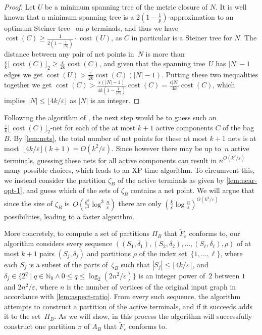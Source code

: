 \documentclass[a4paper]{article}
\let\oldcitet\citet
\renewcommand{\citet}[1]{\mbox{\oldcitet{#1}}}
\theoremstyle{plain}
\newcommand{\eps}{{\varepsilon}}
\DeclareMathOperator{\cost}{cost}
\newcommand{\pow}[1]{\lfloor #1\rfloor_{2}}
\begin{document}
%
\begin{proof}%
Let $U$ be a minimum spanning tree of the metric closure of $N$.
It is well known that a minimum spanning tree is a $2(1-\frac{1}{p})$-approximation to an optimum Steiner tree~\cite{KouMB81} on $p$ terminals, 
and thus we have $\cost(C)\geq\frac{1}{2(1-\frac{1}{|N|})}\cdot\cost(U)$, as $C$ in particular is a Steiner tree for $N$. The distance between any pair of 
net points in~$N$ is more than $\frac{\eps}{k}\pow{\cost(C)}\geq \frac{\eps}{2k}\cost(C)$, 
and given that the spanning tree~$U$ has $|N|-1$ edges we get $\cost(U)>\frac{\eps}{2k}\cost(C)(|N|-1)$. 
Putting these two inequalities together we get $\cost(C)>\frac{\eps(|N|-1)}{4k(1-\frac{1}{|N|})}\cost(C)=\frac{\eps|N|}{4k}\cost(C)$, which implies $|N|\leq\lfloor 4k/\eps\rfloor$ as $|N|$ is an integer.
\end{proof}
%

Following the algorithm of \citet{bateni2011approximation}, the next step would be to guess such an 
$\frac{\eps}{k}\pow{\cost(C)}$-net for each of the at most $k+1$ active components $C$ of the bag $B$.
By \autoref{lem:nets}, the total number of net points for these at most $k+1$ nets is at most~$\lfloor 4k/\eps\rfloor(k+1)=O(k^2/\eps)$.
Since however there may be up to~$n$ active terminals, guessing these nets for all active components
can result in $n^{O(k^2/\eps)}$ many possible choices, which leads to an XP time algorithm. 
To circumvent this, we instead consider the partition $\zeta_B$ of the active terminals as given by \autoref{lem:near-opt-1}, 
and guess which of the sets of $\zeta_B$ contains a net point.
We will argue that since the size of $\zeta_B$ is~$O(\frac{k^6}{\eps^2}\log^3\frac{n}{\eps})$ there are only $(\frac{k}{\eps}\log \frac{n}{\eps})^{O(k^2/\eps)}$ possibilities, leading to a faster algorithm.

%
%
%
%
%
%
%
%

More concretely, to compute a set of partitions $\Pi_B$ that $\widetilde{F}_\eps$ conforms to, 
our algorithm considers every sequence $((S_1,\delta_1),(S_2,\delta_2),\ldots,(S_\ell,\delta_\ell),\rho)$
of at most $k+1$ pairs $(S_j,\delta_j)$ and partitions $\rho$ of the index set~$\{1,\ldots,\ell\}$, 
where each $S_j$ is a subset of the parts of~$\zeta_B$ such that $|S_j|\leq \lfloor 4k/\eps\rfloor$, 
and $\delta_j\in\{2^q\mid q\in\mathbb{N}_0\land 0\leq q\leq \log_2(2n^2/\eps)\}$ is an integer power of~$2$ between $1$
and $2n^2/\eps$, where $n$ is the number of vertices of the original input graph in accordance with \autoref{lem:aspect-ratio}.
From every such sequence, the algorithm attempts to construct a partition of the active terminals, and if it
succeeds adds it to the set~$\Pi_B$. As we will show, in this process the algorithm will successfully construct
one partition $\pi$ of $A_B$ that $\widetilde{F}_\eps$ conforms to.
\end{document}
